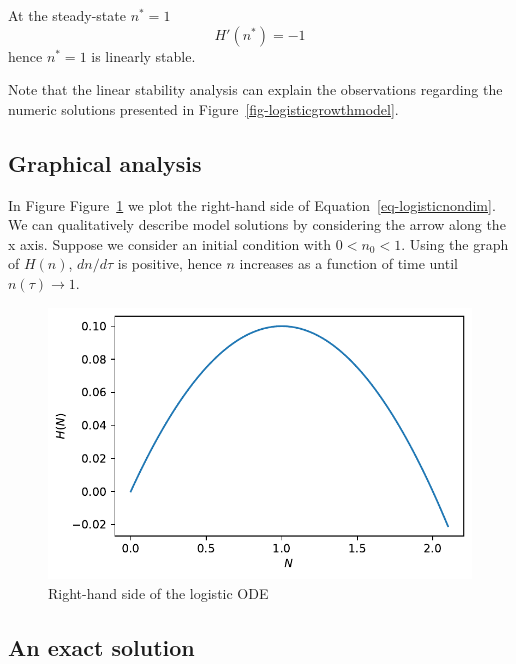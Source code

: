 \documentclass[
  letterpaper,
  DIV=11,
  numbers=noendperiod]{scrreprt}
\begin{document}
At the steady-state \(n^*=1\) \[
H'(n^*)= -1
\] hence \(n^*=1\) is linearly stable.

Note that the linear stability analysis can explain the observations
regarding the numeric solutions presented in
Figure~\ref{fig-logisticgrowthmodel}.

\hypertarget{graphical-analysis}{%
\subsection{Graphical analysis}\label{graphical-analysis}}

In Figure Figure~\ref{fig-dlogisticrhs} we plot the right-hand side of
Equation~\ref{eq-logisticnondim}. We can qualitatively describe model
solutions by considering the arrow along the x axis. Suppose we consider
an initial condition with \(0<n_0<1\). Using the graph of \(H(n)\),
\(dn/d\tau\) is positive, hence \(n\) increases as a function of time
until \(n(\tau)\rightarrow 1\).

\begin{figure}

{\centering \includegraphics{SinglePopODEMOdels_files/figure-pdf/fig-dlogisticrhs-output-1.pdf}

}

\caption{\label{fig-dlogisticrhs}Right-hand side of the logistic ODE}

\end{figure}

\hypertarget{an-exact-solution}{%
\subsection{An exact solution}\label{an-exact-solution}}
\end{document}

